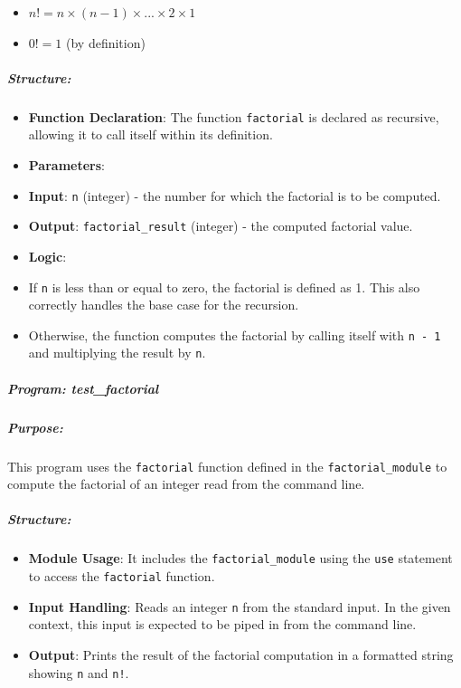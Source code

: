 \begin{itemize}
\item $n! = n \times (n -1) \times ... \times 2 \times 1$
\item $0! = 1$ (by definition)
\end{itemize}

\subparagraph{Structure:}

\begin{itemize}
\item \textbf{Function Declaration}: The function \texttt{factorial} is declared as recursive, allowing it to call itself within its definition.
\item \textbf{Parameters}:
\item \textbf{Input}: \texttt{n} (integer) - the number for which the factorial is to be computed.
\item \textbf{Output}: \texttt{factorial\_result} (integer) - the computed factorial value.
\item \textbf{Logic}:
\item If \texttt{n} is less than or equal to zero, the factorial is defined as 1. This also correctly handles the base case for the recursion.
\item Otherwise, the function computes the factorial by calling itself with \texttt{n - 1} and multiplying the result by \texttt{n}.
\end{itemize}

\subparagraph{Program: test\_factorial}

\subparagraph{Purpose:}

This program uses the \texttt{factorial} function defined in the \texttt{factorial\_module} to compute the factorial of an integer read from the command line.

\subparagraph{Structure:}

\begin{itemize}
\item \textbf{Module Usage}: It includes the \texttt{factorial\_module} using the \texttt{use} statement to access the \texttt{factorial} function.
\item \textbf{Input Handling}: Reads an integer \texttt{n} from the standard input. In the given context, this input is expected to be piped in from the command line.
\item \textbf{Output}: Prints the result of the factorial computation in a formatted string showing \texttt{n} and \texttt{n!}.
\end{itemize}

